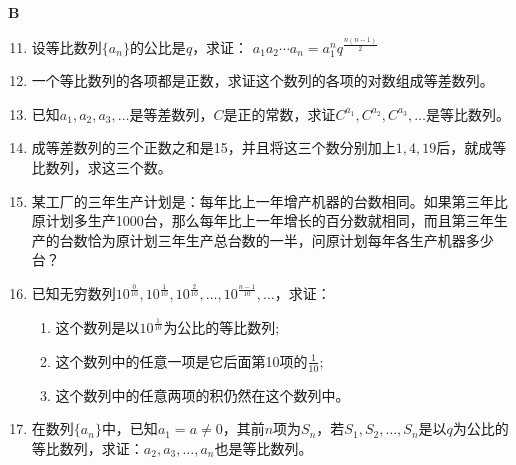 \begin{center}
    \bfseries B
\end{center}

\begin{enumerate}\setcounter{enumi}{10}
    \item 设等比数列$\{a_n\}$的公比是$q$，求证：
    $a_1a_2\cdots a_n=a^n_1q^{\tfrac{n(n-1)}{2}}$
    \item 一个等比数列的各项都是正数，求证这个数列的各项的对数组成等差数列。
    \item 已知$a_1,a_2,a_3,\ldots$是等差数列，$C$是正的常数，求证$C^{a_1},C^{a_2},C^{a_3},\ldots$是等比数列。
    \item 成等差数列的三个正数之和是15，并且将这三个数分别加上$1,4,19$后，就成等比数列，求这三个数。
    \item 某工厂的三年生产计划是：每年比上一年增产机器的台数相同。如果第三年比原计划多生产1000台，那么每年比上一年增长的百分数就相同，而且第三年生产的台数恰为原计划三年生产总台数的一半，问原计划每年各生产机器多少台？
    \item 已知无穷数列$10^{\tfrac{0}{10}},10^{\tfrac{1}{10}},10^{\tfrac{2}{10}},\ldots,10^{\tfrac{n-1}{10}},\ldots$，求证：
\begin{enumerate}[(1)]
    \item 这个数列是以$10^{\tfrac{1}{10}}$为公比的等比数列;
    \item 这个数列中的任意一项是它后面第10项的$\frac{1}{10}$;
    \item 这个数列中的任意两项的积仍然在这个数列中。
\end{enumerate}

\item 在数列$\{a_n\}$中，已知$a_1=a\ne 0$，其前$n$项为$S_n$，若$S_1,S_2,\ldots,S_n$是以$q$为公比的等比数列，求证：$a_2,a_3,\ldots,a_n$也是等比数列。
\end{enumerate}


